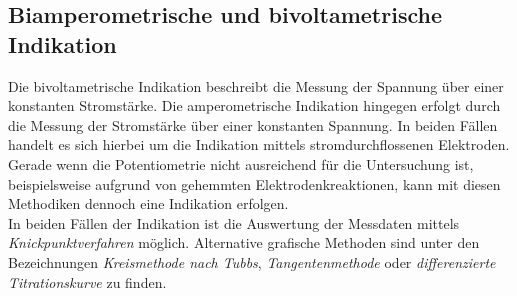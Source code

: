 \subsection*{Biamperometrische und bivoltametrische Indikation}
Die bivoltametrische Indikation beschreibt die Messung der Spannung über einer konstanten Stromstärke. Die amperometrische Indikation hingegen erfolgt durch die Messung der Stromstärke über einer konstanten Spannung. In beiden Fällen handelt es sich hierbei um die Indikation mittels stromdurchflossenen Elektroden. Gerade wenn die Potentiometrie nicht ausreichend für die Untersuchung ist, beispielsweise aufgrund von gehemmten Elektrodenkreaktionen, kann mit diesen Methodiken dennoch eine Indikation erfolgen.\\
In beiden Fällen der Indikation ist die Auswertung der Messdaten mittels \textit{Knickpunktverfahren} möglich. Alternative grafische Methoden sind unter den Bezeichnungen \textit{Kreismethode nach Tubbs}, \textit{Tangentenmethode} oder \textit{differenzierte Titrationskurve} zu finden.

